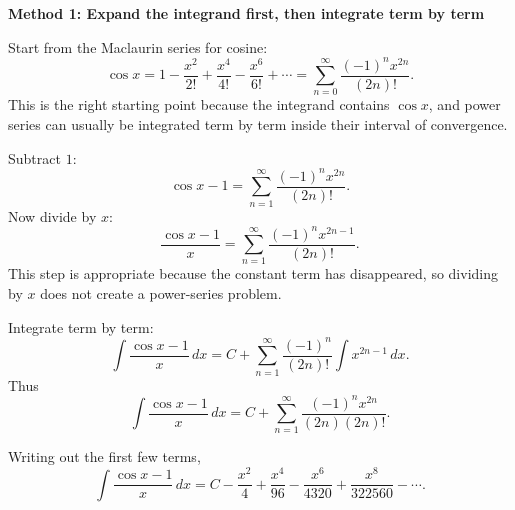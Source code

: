 \documentclass[a4paper,12pt,twocolumn]{article}
\newenvironment{solutionbox}{\begin{framed}}{\end{framed}}
\begin{document}
\begin{solutionbox}
\textbf{Method 1: Expand the integrand first, then integrate term by term}

\begin{steps}
\item Start from the Maclaurin series for cosine:
\[
\cos x=1-\frac{x^2}{2!}+\frac{x^4}{4!}-\frac{x^6}{6!}+\cdots
=\sum_{n=0}^{\infty}\frac{(-1)^n x^{2n}}{(2n)!}.
\]
This is the right starting point because the integrand contains \(\cos x\), and power series can usually be integrated term by term inside their interval of convergence.

\item Subtract \(1\):
\[
\cos x-1
=\sum_{n=1}^{\infty}\frac{(-1)^n x^{2n}}{(2n)!}.
\]
Now divide by \(x\):
\[
\frac{\cos x-1}{x}
=\sum_{n=1}^{\infty}\frac{(-1)^n x^{2n-1}}{(2n)!}.
\]
This step is appropriate because the constant term has disappeared, so dividing by \(x\) does not create a power-series problem.

\item Integrate term by term:
\[
\int \frac{\cos x-1}{x}\,dx
=C+\sum_{n=1}^{\infty}\frac{(-1)^n}{(2n)!}\int x^{2n-1}\,dx.
\]
Thus
\[
\int \frac{\cos x-1}{x}\,dx
=C+\sum_{n=1}^{\infty}\frac{(-1)^n x^{2n}}{(2n)(2n)!}.
\]

\item Writing out the first few terms,
\[
\int \frac{\cos x-1}{x}\,dx
=C-\frac{x^2}{4}+\frac{x^4}{96}-\frac{x^6}{4320}+\frac{x^8}{322560}-\cdots.
\]
\end{steps}
\end{solutionbox}
\end{document}
